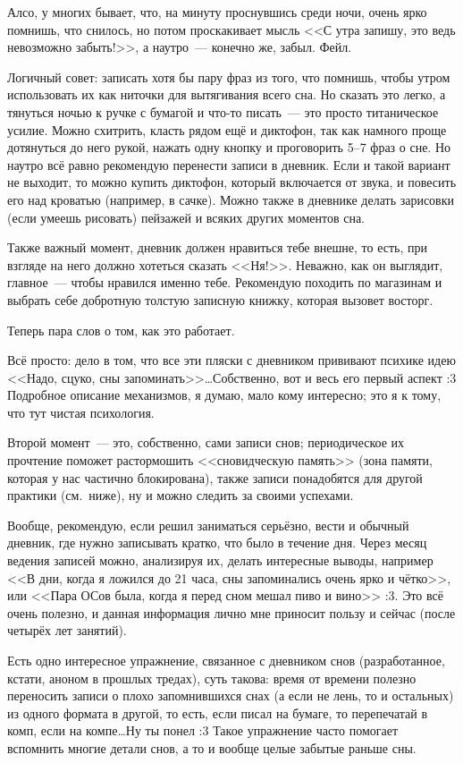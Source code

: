 \documentclass[a4paper,14pt,oneside]{memoir}
\begin{document}
Алсо, у многих бывает, что, на минуту проснувшись среди ночи, очень ярко помнишь, что снилось, но потом проскакивает мысль <<С утра запишу, это ведь невозможно забыть!>>, а наутро~--- конечно же, забыл. Фейл.

Логичный совет: записать хотя бы пару фраз из того, что помнишь, чтобы утром использовать их как ниточки для вытягивания всего сна. Но сказать это легко, а тянуться ночью к ручке с бумагой и что-то писать~--- это просто титаническое усилие. Можно схитрить, класть рядом ещё и диктофон, так как намного проще дотянуться до него рукой, нажать одну кнопку и проговорить 5--7 фраз о сне. Но наутро всё равно рекомендую перенести записи в дневник. Если и такой вариант не выходит, то можно купить диктофон, который включается от звука, и повесить его над кроватью (например, в сачке). Можно также в дневнике делать зарисовки (если умеешь рисовать) пейзажей и всяких других моментов сна.

Также важный момент, дневник должен нравиться тебе внешне, то есть, при взгляде на него должно хотеться сказать <<Ня!>>. Неважно, как он выглядит, главное~--- чтобы нравился именно тебе. Рекомендую походить по магазинам и выбрать себе добротную толстую записную книжку, которая вызовет восторг.

Теперь пара слов о том, как это работает.

Всё просто: дело в том, что все эти пляски с дневником прививают психике идею <<Надо, сцуко, сны запоминать>>\ldots Собственно, вот и весь его первый аспект :3 Подробное описание механизмов, я думаю, мало кому интересно; это я к тому, что тут чистая психология.

Второй момент~--- это, собственно, сами записи снов; периодическое их прочтение поможет растормошить <<сновидческую память>> (зона памяти, которая у нас частично блокирована), также записи понадобятся для другой практики (см.~ниже), ну и можно следить за своими успехами.

Вообще, рекомендую, если решил заниматься серьёзно, вести и обычный дневник, где нужно записывать кратко, что было в течение дня. Через месяц ведения записей можно, анализируя их, делать интересные выводы, например <<В дни, когда я ложился до 21 часа, сны запоминались очень ярко и чётко>>, или <<Пара ОСов была, когда я перед сном мешал пиво и вино>> :3. Это всё очень полезно, и данная информация лично мне приносит пользу и сейчас (после четырёх лет занятий).

Есть одно интересное упражнение, связанное с дневником снов (разработанное, кстати, аноном в прошлых тредах), суть такова: время от времени полезно переносить записи о плохо запомнившихся снах (а если не лень, то и остальных) из одного формата в другой, то есть, если писал на бумаге, то перепечатай в комп, если на компе\ldots Ну ты понел :3 Такое упражнение часто помогает вспомнить многие детали снов, а то и вообще целые забытые раньше сны.
 
\end{document}
